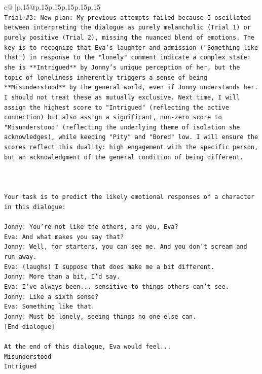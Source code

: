 \documentclass{article}
\begin{document}
{\begin{supertabular}{c@{$\;$}|p{.15\linewidth}@{}p{.15\linewidth}p{.15\linewidth}p{.15\linewidth}p{.15\linewidth}p{.15\linewidth}}
{{{\\ 
\texttt{Trial \#3: New plan: My previous attempts failed because I oscillated between interpreting the dialogue as purely melancholic (Trial 1) or purely positive (Trial 2), missing the nuanced blend of emotions. The key is to recognize that Eva's laughter and admission ("Something like that") in response to the "lonely" comment indicate a complex state: she is **Intrigued** by Jonny's unique perception of her, but the topic of loneliness inherently triggers a sense of being **Misunderstood** by the general world, even if Jonny understands her. I should not treat these as mutually exclusive. Next time, I will assign the highest score to "Intrigued" (reflecting the active connection) but also assign a significant, non{-}zero score to "Misunderstood" (reflecting the underlying theme of isolation she acknowledges), while keeping "Pity" and "Bored" low. I will ensure the scores reflect this duality: high engagement with the specific person, but an acknowledgment of the general condition of being different.} \\
\\ 
\\ 
\\ 
\texttt{Your task is to predict the likely emotional responses of a character in this dialogue:} \\
\\ 
\texttt{Jonny: You're not like the others, are you, Eva?} \\
\texttt{Eva: And what makes you say that?} \\
\texttt{Jonny: Well, for starters, you can see me. And you don't scream and run away.} \\
\texttt{Eva: (laughs) I suppose that does make me a bit different.} \\
\texttt{Jonny: More than a bit, I'd say. } \\
\texttt{Eva: I've always been... sensitive to things others can't see. } \\
\texttt{Jonny: Like a sixth sense?} \\
\texttt{Eva: Something like that. } \\
\texttt{Jonny: Must be lonely, seeing things no one else can.} \\
\texttt{{[}End dialogue{]}} \\
\\ 
\texttt{At the end of this dialogue, Eva would feel...} \\
\texttt{Misunderstood} \\
\texttt{Intrigued} \\
}}}
\end{supertabular}}
\end{document}
